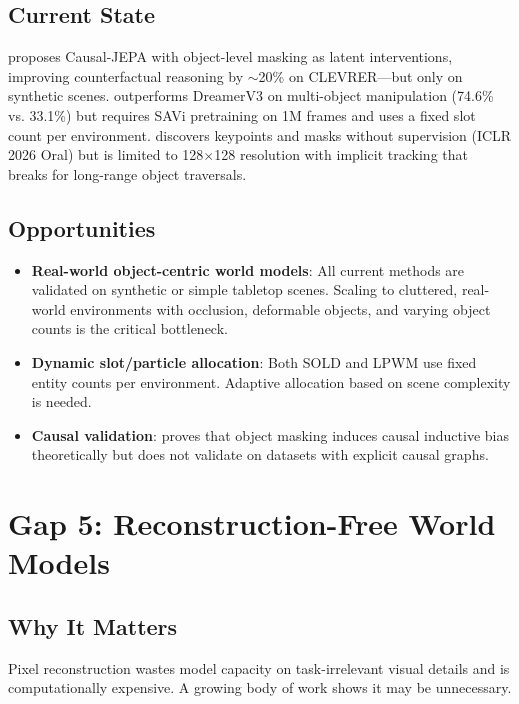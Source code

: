 \documentclass[11pt,a4paper]{article}
\begin{document}
\subsection{Current State}
\citet{nam2026causaljepa} proposes Causal-JEPA with object-level masking as latent interventions, improving counterfactual reasoning by $\sim$20\% on CLEVRER---but only on synthetic scenes. \citet{mosbach2025sold} outperforms DreamerV3 on multi-object manipulation (74.6\% vs. 33.1\%) but requires SAVi pretraining on 1M frames and uses a fixed slot count per environment. \citet{daniel2026lpwm} discovers keypoints and masks without supervision (ICLR 2026 Oral) but is limited to 128$\times$128 resolution with implicit tracking that breaks for long-range object traversals.

\subsection{Opportunities}
\begin{itemize}[noitemsep]
    \item \textbf{Real-world object-centric world models}: All current methods are validated on synthetic or simple tabletop scenes. Scaling to cluttered, real-world environments with occlusion, deformable objects, and varying object counts is the critical bottleneck.
    \item \textbf{Dynamic slot/particle allocation}: Both SOLD \citep{mosbach2025sold} and LPWM \citep{daniel2026lpwm} use fixed entity counts per environment. Adaptive allocation based on scene complexity is needed.
    \item \textbf{Causal validation}: \citet{nam2026causaljepa} proves that object masking induces causal inductive bias theoretically but does not validate on datasets with explicit causal graphs.
\end{itemize}

\section{Gap 5: Reconstruction-Free World Models}

\subsection{Why It Matters}
Pixel reconstruction wastes model capacity on task-irrelevant visual details and is computationally expensive. A growing body of work shows it may be unnecessary.
\end{document}
